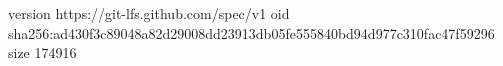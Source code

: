 version https://git-lfs.github.com/spec/v1
oid sha256:ad430f3c89048a82d29008dd23913db05fe555840bd94d977c310fac47f59296
size 174916
